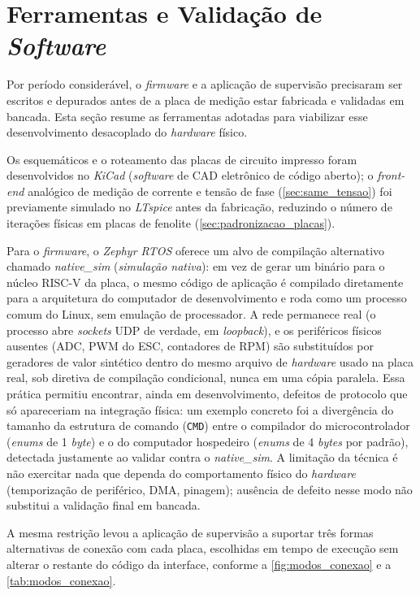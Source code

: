 \section{Ferramentas e Validação de \textit{Software}}
\label{sec:ferramentas_software}

Por período considerável, o \textit{firmware} e a aplicação de supervisão
precisaram ser escritos e depurados antes de a placa de medição estar
fabricada e validadas em bancada. Esta seção resume as ferramentas adotadas
para viabilizar esse desenvolvimento desacoplado do \textit{hardware} físico.

Os esquemáticos e o roteamento das placas de circuito impresso foram
desenvolvidos no \textit{KiCad} (\textit{software} de CAD eletrônico de código
aberto); o \textit{front-end} analógico de medição de corrente e tensão de
fase (\autoref{sec:same_tensao}) foi previamente simulado no
\textit{LTspice} antes da fabricação, reduzindo o número de iterações físicas
em placas de fenolite (\autoref{sec:padronizacao_placas}).

Para o \textit{firmware}, o \textit{Zephyr RTOS} oferece um alvo de compilação
alternativo chamado \textit{native\_sim} (\textit{simulação nativa}): em vez de
gerar um binário para o núcleo RISC-V da placa, o mesmo código de aplicação é
compilado diretamente para a arquitetura do computador de desenvolvimento e
roda como um processo comum do Linux, sem emulação de processador. A rede
permanece real (o processo abre \textit{sockets} UDP de verdade, em
\textit{loopback}), e os periféricos físicos ausentes (ADC, PWM do ESC,
contadores de RPM) são substituídos por geradores de valor sintético dentro do
mesmo arquivo de \textit{hardware} usado na placa real, sob diretiva de
compilação condicional, nunca em uma cópia paralela. Essa prática permitiu
encontrar, ainda em desenvolvimento, defeitos de protocolo que só apareceriam
na integração física: um exemplo concreto foi a divergência do tamanho da
estrutura de comando (\texttt{CMD}) entre o compilador do microcontrolador
(\textit{enums} de 1 \textit{byte}) e o do computador hospedeiro (\textit{enums}
de 4 \textit{bytes} por padrão), detectada justamente ao validar contra o
\textit{native\_sim}. A limitação da técnica é não exercitar nada que dependa
do comportamento físico do \textit{hardware} (temporização de periférico, DMA,
pinagem); ausência de defeito nesse modo não substitui a validação final em
bancada.

A mesma restrição levou a aplicação de supervisão a suportar três formas
alternativas de conexão com cada placa, escolhidas em tempo de execução sem
alterar o restante do código da interface, conforme a
\autoref{fig:modos_conexao} e a \autoref{tab:modos_conexao}.

